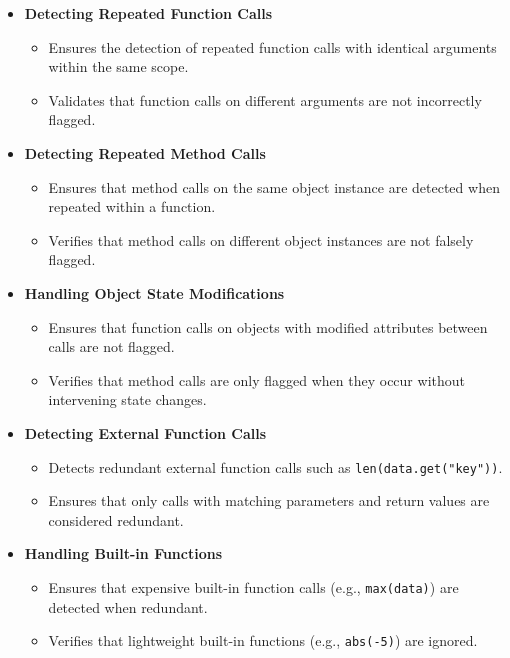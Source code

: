 \documentclass[12pt, titlepage]{article}
\begin{document}
  \begin{itemize}
    \item \textbf{Detecting Repeated Function Calls}
      \begin{itemize}
        \item Ensures the detection of repeated function calls with
          identical arguments within the same scope.
        \item Validates that function calls on different arguments
          are not incorrectly flagged.
      \end{itemize}

    \item \textbf{Detecting Repeated Method Calls}
      \begin{itemize}
        \item Ensures that method calls on the same object instance
          are detected when repeated within a function.
        \item Verifies that method calls on different object
          instances are not falsely flagged.
      \end{itemize}

    \item \textbf{Handling Object State Modifications}
      \begin{itemize}
        \item Ensures that function calls on objects with modified
          attributes between calls are not flagged.
        \item Verifies that method calls are only flagged when they
          occur without intervening state changes.
      \end{itemize}

    \item \textbf{Detecting External Function Calls}
      \begin{itemize}
        \item Detects redundant external function calls such as
          \texttt{len(data.get("key"))}.
        \item Ensures that only calls with matching parameters and
          return values are considered redundant.
      \end{itemize}

    \item \textbf{Handling Built-in Functions}
      \begin{itemize}
        \item Ensures that expensive built-in function calls (e.g.,
          \texttt{max(data)}) are detected when redundant.
        \item Verifies that lightweight built-in functions (e.g.,
          \texttt{abs(-5)}) are ignored.
      \end{itemize}


\end{itemize}
\end{document}
